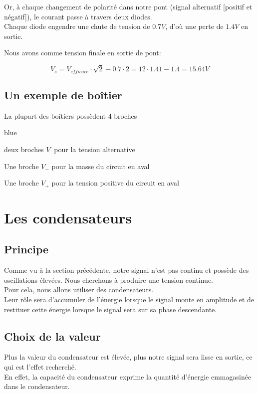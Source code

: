   Or, à chaque changement de polarité dans notre pont (signal alternatif [positif et négatif]), le courant passe à travers 
  deux diodes.\\

  Chaque diode engendre une chute de tension de $0.7V$, d'où une perte de $1.4V$ en sortie.

  Nous avons comme tension finale en sortie de pont: 

  $$V_{s} = V_{efficace}\cdot \sqrt{2} - 0.7\cdot 2 = 12\cdot 1.41 -1.4 = 15.64 V$$


  \subsection{Un exemple de boîtier}

    La plupart des boîtiers possèdent 4 broches

    \begin{items}{blue}{\Triangle}
      \item deux broches $V_{~}$ pour la tension alternative
      \item Une broche $V_-$ pour la masse du circuit en aval
      \item Une broche $V_+$ pour la tension positive du circuit en aval
   \end{items}



  \section{Les condensateurs}

  \subsection{Principe}
  Comme vu à la section précédente, notre signal n'est pas continu et possède des oscillations élevées.
  Nous cherchons à produire une tension continue.\\

  Pour cela, nous allons utiliser des condensateurs.\\

  Leur rôle sera d'accumuler de l'énergie lorsque le signal monte en amplitude et de restituer cette énergie lorsque le signal sera sur sa phase descendante.


  \subsection{Choix de la valeur}
  Plus la valeur du condensateur est élevée, plus notre signal sera lisse en sortie, ce qui est l'effet recherché.\\
  En effet, la capacité du condensateur exprime la quantité d'énergie emmagasinée dans le condensateur.\\

